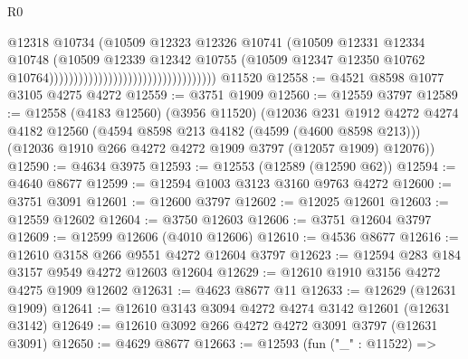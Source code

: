 \begin{lexlean}{R0}
\begin{coremodule}
                                                                @12318
                                                                @10734
                                                                (@10509
                                                                  @12323
                                                                  @12326
                                                                  @10741
                                                                  (@10509
                                                                    @12331
                                                                    @12334
                                                                    @10748
                                                                    (@10509
                                                                      @12339
                                                                      @12342
                                                                      @10755
                                                                      (@10509
                                                                        @12347
                                                                        @12350
                                                                        @10762
                                                                        @10764))))))))))))))))))))))))))))))))))
    @11520
@12558 := @4521 @8598 @1077 @3105 @4275 @4272
@12559 := @3751 @1909
@12560 := @12559 @3797
@12589 := @12558
    (@4183 @12560)
    (@3956 @11520)
    (@12036
      @231
      @1912
      @4272
      @4274
      @4182
      @12560
      (@4594 @8598 @213 @4182 (@4599 (@4600 @8598 @213)))
      (@12036 @1910 @266 @4272 @4272 @1909 @3797 (@12057 @1909) @12076))
@12590 := @4634 @3975
@12593 := @12553 (@12589 (@12590 @62))
@12594 := @4640 @8677
@12599 := @12594 @1003 @3123 @3160 @9763 @4272
@12600 := @3751 @3091
@12601 := @12600 @3797
@12602 := @12025 @12601
@12603 := @12559 @12602
@12604 := @3750 @12603
@12606 := @3751 @12604 @3797
@12609 := @12599 @12606 (@4010 @12606)
@12610 := @4536 @8677
@12616 := @12610 @3158 @266 @9551 @4272 @12604 @3797
@12623 := @12594 @283 @184 @3157 @9549 @4272 @12603 @12604
@12629 := @12610 @1910 @3156 @4272 @4275 @1909 @12602
@12631 := @4623 @8677 @11
@12633 := @12629 (@12631 @1909)
@12641 := @12610 @3143 @3094 @4272 @4274 @3142 @12601 (@12631 @3142)
@12649 := @12610 @3092 @266 @4272 @4272 @3091 @3797 (@12631 @3091)
@12650 := @4629 @8677
@12663 := @12593
    (fun ("_" : @11522) =>

\end{coremodule}
\end{lexlean}

